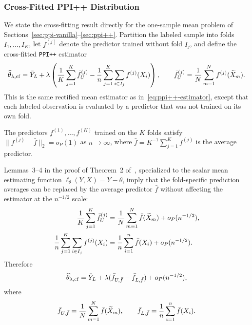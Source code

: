 \subsubsection{Cross-Fitted PPI++ Distribution}
\label{sec:proof-cross-fitting}

We state the cross-fitting result directly for the one-sample mean problem of
Sections~\ref{sec:ppi-vanilla}--\ref{sec:ppi++}. Partition the labeled sample
into folds $I_1,\ldots,I_K$, let $f^{(j)}$ denote the predictor trained
without fold $I_j$, and define the cross-fitted \texttt{PPI++} estimator
\[
\widehat{\theta}_{\lambda,\mathrm{cf}}
=
\bar Y_L
+
\lambda\left(
\frac{1}{K}\sum_{j=1}^K \bar f_{U}^{(j)}
-
\frac{1}{n}\sum_{j=1}^K\sum_{i\in I_j} f^{(j)}(X_i)
\right),
\qquad
\bar f_U^{(j)} = \frac{1}{N}\sum_{m=1}^N f^{(j)}(\widetilde X_m).
\]
This is the same rectified mean estimator as in~\eqref{eq:ppi++-estimator},
except that each labeled observation is evaluated by a predictor that was not
trained on its own fold.

\begin{assumption}\label{ass:M-stable-f}
The predictors $f^{(1)},\ldots,f^{(K)}$ trained on the $K$ folds satisfy
$\|f^{(j)} - \bar f\|_2 = o_P(1)$ as $n \to \infty$,
where $\bar f = K^{-1}\sum_{j=1}^K f^{(j)}$ is the average predictor.
\end{assumption}

Lemmas~3--4 in the proof of Theorem~2 of~\citet{zrnic2024cross}, specialized
to the scalar mean estimating function $\ell_\theta(Y,X)=Y-\theta$, imply
that the fold-specific prediction averages can be replaced by the average
predictor $\bar f$ without affecting the estimator at the $n^{-1/2}$ scale:
\begin{align*}
\frac{1}{K}\sum_{j=1}^K \bar f_U^{(j)}
&=
\frac{1}{N}\sum_{m=1}^N \bar f(\widetilde X_m) + o_P(n^{-1/2}), \\
\frac{1}{n}\sum_{j=1}^K\sum_{i\in I_j} f^{(j)}(X_i)
&=
\frac{1}{n}\sum_{i=1}^n \bar f(X_i) + o_P(n^{-1/2}).
\end{align*}
Therefore
\[
\widehat{\theta}_{\lambda,\mathrm{cf}}
=
\bar Y_L + \lambda(\bar f_{U,\bar f} - \bar f_{L,\bar f}) + o_P(n^{-1/2}),
\]
where
\[
\bar f_{U,\bar f} = \frac{1}{N}\sum_{m=1}^N \bar f(\widetilde X_m),
\qquad
\bar f_{L,\bar f} = \frac{1}{n}\sum_{i=1}^n \bar f(X_i).
\]

